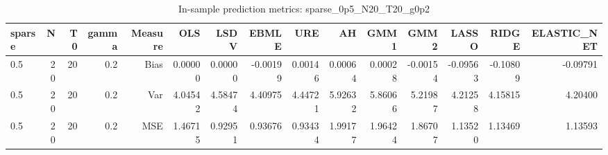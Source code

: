 \begin{table}[!htbp]\centering
\caption{In-sample prediction metrics: sparse_0p5_N20_T20_g0p2}
\label{tab:table2_sparse_0p5_N20_T20_g0p2}
\begin{tabular}{lrrrrrrrrrrrrrr}
\hline
sparse & N & T0 & gamma & Measure & OLS & LSDV & EBMLE & URE & AH & GMM1 & GMM2 & LASSO & RIDGE & ELASTIC_NET \\
\hline
0.5 & 20 & 20 & 0.2 & Bias & 0.00000 & 0.00000 & -0.00199 & 0.00146 & 0.00064 & 0.00028 & -0.00154 & -0.09563 & -0.10809 & -0.09791 \\
0.5 & 20 & 20 & 0.2 & Var & 4.04542 & 4.58474 & 4.40975 & 4.44721 & 5.92632 & 5.86066 & 5.21987 & 4.21258 & 4.15815 & 4.20400 \\
0.5 & 20 & 20 & 0.2 & MSE & 1.46715 & 0.92951 & 0.93676 & 0.93434 & 1.99177 & 1.96424 & 1.86707 & 1.13520 & 1.13469 & 1.13593 \\
\hline
\end{tabular}
\end{table}

